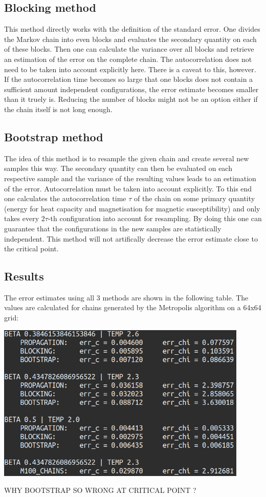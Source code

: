 \documentclass[11pt, a4paper]{scrartcl}
\begin{document}
\subsection{Blocking method}
    This method directly works with the definition of the standard error. One divides the Markov chain into even blocks and evaluates the secondary quantity on each of these blocks. Then one can calculate the variance over all blocks and retrieve an estimation of the error on the complete chain. The autocorrelation does not need to be taken into account explicitly here. There is a caveat to this, however. If the autocorrelation time becomes so large that one blocks does not contain a sufficient amount independent configurations, the error estimate becomes smaller than it truely is. Reducing the number of blocks might not be an option either if the chain itself is not long enough.
\subsection{Bootstrap method}
    The idea of this method is to resample the given chain and create several new samples this way. The secondary quantity can then be evaluated on each respective sample and the variance of the resulting values leads to an estimation of the error. Autocorrelation must be taken into account explicitly. To this end one calculates the autocorrelation time $\tau$ of the chain on some primary quantity (energy for heat capacity and magnetisation for magnetic susceptibility) and only takes every $2\tau$-th configuration into account for resampling. By doing this one can guarantee that the configurations in the new samples are statistically independent. This method will not artifically decrease the error estimate close to the critical point.
\subsection{Results}
    The error estimates using all 3 methods are shown in the following table. The values are calculated for chains generated by the Metropolis algorithm on a 64x64 grid:
    \begin{center}
    \includegraphics[width=12cm]{table_errors.png}
    \end{center}
    WHY BOOTSTRAP SO WRONG AT CRITICAL POINT ?
    
\end{document}
